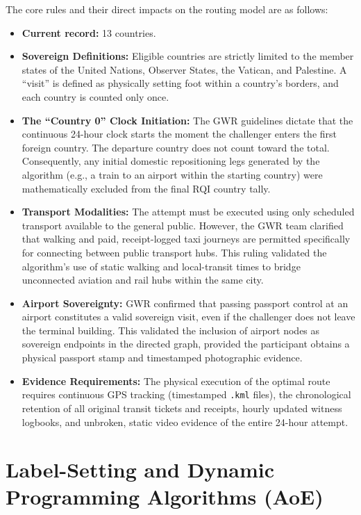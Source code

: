 The core rules and their direct impacts on the routing model are as follows:
\begin{itemize}
  \item \textbf{Current record:} 13 countries.
  \item \textbf{Sovereign Definitions:} Eligible countries are strictly limited to the member states of the United Nations, Observer States, the Vatican, and Palestine. A ``visit'' is defined as physically setting foot within a country's borders, and each country is counted only once.
  \item \textbf{The ``Country 0'' Clock Initiation:} The GWR guidelines dictate that the continuous 24-hour clock starts the moment the challenger enters the first foreign country. The departure country does not count toward the total. Consequently, any initial domestic repositioning legs generated by the algorithm (e.g., a train to an airport within the starting country) were mathematically excluded from the final RQI country tally.
  \item \textbf{Transport Modalities:} The attempt must be executed using only scheduled transport available to the general public. However, the GWR team clarified that walking and paid, receipt-logged taxi journeys are permitted specifically for connecting between public transport hubs. This ruling validated the algorithm's use of static walking and local-transit times to bridge unconnected aviation and rail hubs within the same city.
  \item \textbf{Airport Sovereignty:} GWR confirmed that passing passport control at an airport constitutes a valid sovereign visit, even if the challenger does not leave the terminal building. This validated the inclusion of airport nodes as sovereign endpoints in the directed graph, provided the participant obtains a physical passport stamp and timestamped photographic evidence.
  \item \textbf{Evidence Requirements:} The physical execution of the optimal route requires continuous GPS tracking (timestamped \texttt{.kml} files), the chronological retention of all original transit tickets and receipts, hourly updated witness logbooks, and unbroken, static video evidence of the entire 24-hour attempt.
\end{itemize}

\chapter{Label-Setting and Dynamic Programming Algorithms (AoE)}
\label{sec:appendix-b-algorithms}

